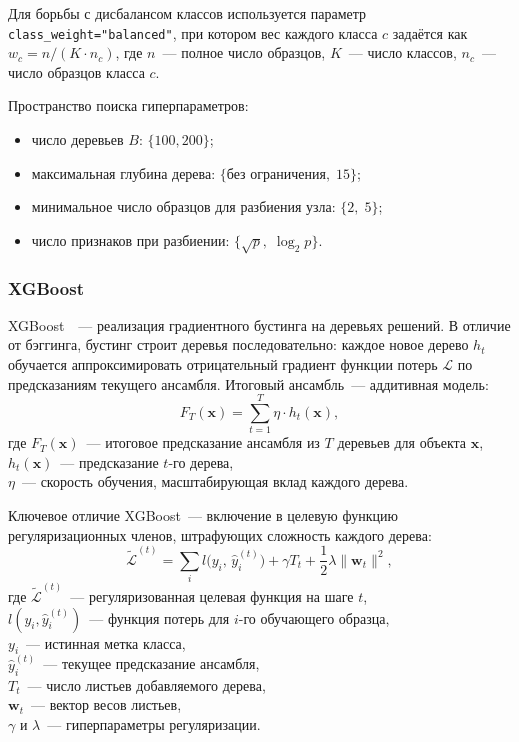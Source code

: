 Для борьбы с дисбалансом классов используется параметр \texttt{class\_weight="balanced"}, при котором вес каждого класса $c$ задаётся как $w_c = n / (K \cdot n_c)$, где $n$~--- полное число образцов, $K$~--- число классов, $n_c$~--- число образцов класса $c$.

Пространство поиска гиперпараметров:
\begin{itemize}
    \item число деревьев $B$: $\{100, 200\}$;
    \item максимальная глубина дерева: $\{\text{без ограничения},\; 15\}$;
    \item минимальное число образцов для разбиения узла: $\{2,\; 5\}$;
    \item число признаков при разбиении: $\{\sqrt{p},\; \log_2 p\}$.
\end{itemize}

\subsubsection{XGBoost}

XGBoost~\cite{xgboost_paper}~--- реализация градиентного бустинга на деревьях решений. В отличие от бэггинга, бустинг строит деревья последовательно: каждое новое дерево $h_t$ обучается аппроксимировать отрицательный градиент функции потерь $\mathcal{L}$ по предсказаниям текущего ансамбля. Итоговый ансамбль~--- аддитивная модель:
\begin{equation}\label{eq:xgb_ensemble}
    F_T(\mathbf{x}) = \sum_{t=1}^{T} \eta \cdot h_t(\mathbf{x}),
\end{equation}
где $F_T(\mathbf{x})$~--- итоговое предсказание ансамбля из $T$ деревьев для объекта $\mathbf{x}$, \\ $h_t(\mathbf{x})$~--- предсказание $t$-го дерева, \\ $\eta$~--- скорость обучения, масштабирующая вклад каждого дерева.

Ключевое отличие XGBoost~--- включение в целевую функцию регуляризационных членов, штрафующих сложность каждого дерева:
\begin{equation}\label{eq:xgb_objective}
    \widetilde{\mathcal{L}}^{(t)} = \sum_{i} l\bigl(y_i,\, \hat{y}_i^{(t)}\bigr) + \gamma T_t + \frac{1}{2}\lambda \|\mathbf{w}_t\|^2,
\end{equation}
где $\widetilde{\mathcal{L}}^{(t)}$~--- регуляризованная целевая функция на шаге $t$, \\ $l(y_i, \hat{y}_i^{(t)})$~--- функция потерь для $i$-го обучающего образца, \\ $y_i$~--- истинная метка класса, \\ $\hat{y}_i^{(t)}$~--- текущее предсказание ансамбля, \\ $T_t$~--- число листьев добавляемого дерева, \\ $\mathbf{w}_t$~--- вектор весов листьев, \\ $\gamma$ и $\lambda$~--- гиперпараметры регуляризации.

